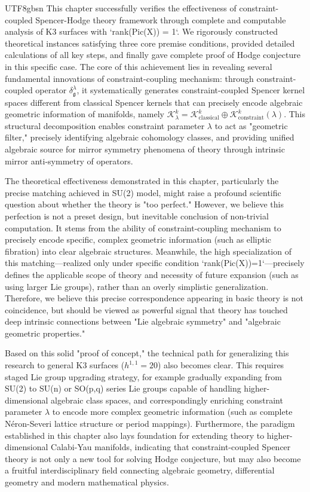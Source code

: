 \documentclass[a4paper,12pt]{extarticle}
\theoremstyle{definition}
\begin{document}
\begin{CJK}{UTF8}{gbsn}
This chapter successfully verifies the effectiveness of constraint-coupled Spencer-Hodge theory framework through complete and computable analysis of K3 surfaces with `rank(Pic(X)) = 1`. We rigorously constructed theoretical instances satisfying three core premise conditions, provided detailed calculations of all key steps, and finally gave complete proof of Hodge conjecture in this specific case. The core of this achievement lies in revealing several fundamental innovations of constraint-coupling mechanism: through constraint-coupled operator $\delta^\lambda_\mathfrak{g}$, it systematically generates constraint-coupled Spencer kernel spaces different from classical Spencer kernels that can precisely encode algebraic geometric information of manifolds, namely $\mathcal{K}^k_\lambda = \mathcal{K}^k_{\text{classical}} \oplus \mathcal{K}^k_{\text{constraint}}(\lambda)$. This structural decomposition enables constraint parameter $\lambda$ to act as "geometric filter," precisely identifying algebraic cohomology classes, and providing unified algebraic source for mirror symmetry phenomena of theory through intrinsic mirror anti-symmetry of operators.

The theoretical effectiveness demonstrated in this chapter, particularly the precise matching achieved in SU(2) model, might raise a profound scientific question about whether the theory is "too perfect." However, we believe this perfection is not a preset design, but inevitable conclusion of non-trivial computation. It stems from the ability of constraint-coupling mechanism to precisely encode specific, complex geometric information (such as elliptic fibration) into clear algebraic structures. Meanwhile, the high specialization of this matching—realized only under specific condition `rank(Pic(X))=1`—precisely defines the applicable scope of theory and necessity of future expansion (such as using larger Lie groups), rather than an overly simplistic generalization. Therefore, we believe this precise correspondence appearing in basic theory is not coincidence, but should be viewed as powerful signal that theory has touched deep intrinsic connections between "Lie algebraic symmetry" and "algebraic geometric properties."

Based on this solid "proof of concept," the technical path for generalizing this research to general K3 surfaces ($h^{1,1} = 20$) also becomes clear. This requires staged Lie group upgrading strategy, for example gradually expanding from SU(2) to SU(n) or SO(p,q) series Lie groups capable of handling higher-dimensional algebraic class spaces, and correspondingly enriching constraint parameter $\lambda$ to encode more complex geometric information (such as complete Néron-Severi lattice structure or period mappings). Furthermore, the paradigm established in this chapter also lays foundation for extending theory to higher-dimensional Calabi-Yau manifolds, indicating that constraint-coupled Spencer theory is not only a new tool for solving Hodge conjecture, but may also become a fruitful interdisciplinary field connecting algebraic geometry, differential geometry and modern mathematical physics.


\end{CJK}
\end{document}
